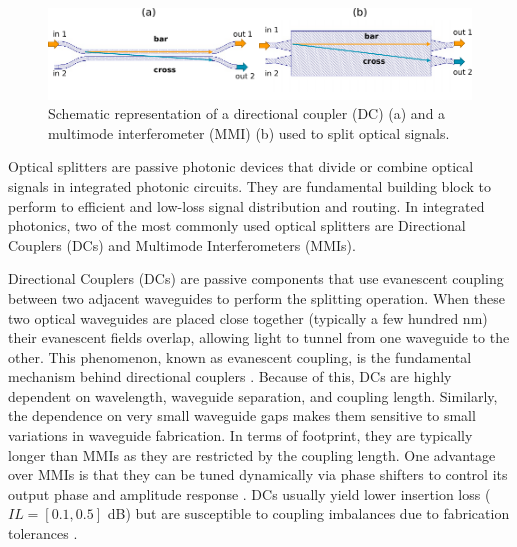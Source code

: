 \begin{figure}[h]
	\begin{center}
		\includegraphics{figures/ch2-splitters.pdf}
	\end{center}
	\caption{Schematic representation of a directional coupler (DC) (a) and a multimode interferometer (MMI) (b) used to split optical signals.}\label{fig:ch2-splitters}
\end{figure}

Optical splitters are passive photonic devices that divide or combine optical signals in integrated photonic circuits.
They are fundamental building block to perform to efficient and low-loss signal distribution and routing.
In integrated photonics, two of the most commonly used optical splitters are Directional Couplers (DCs) and Multimode Interferometers (MMIs).

Directional Couplers (DCs) are passive components that use evanescent coupling between two adjacent waveguides to perform the splitting operation.
When these two optical waveguides are placed close together (typically a few hundred nm) their evanescent fields overlap, allowing light to tunnel from one waveguide to the other.
This phenomenon, known as evanescent coupling, is the fundamental mechanism behind directional couplers \cite{tormen_wavelength-flattened_2005,chen_broadband_2017,chen_low-loss_2016}.
Because of this, DCs are highly dependent on wavelength, waveguide separation, and coupling length.
Similarly, the dependence on very small waveguide gaps makes them sensitive to small variations in waveguide fabrication.
In terms of footprint, they are typically longer than MMIs as they are restricted by the coupling length.
One advantage over MMIs is that they can be tuned dynamically via phase shifters to control its output phase and amplitude response \cite{perez-lopez_integrated_2019}.
DCs usually yield lower insertion loss (\(IL = [0.1, 0.5]\) dB) but are susceptible to coupling imbalances due to fabrication tolerances \cite{darmawan_rigorous_2005}.

